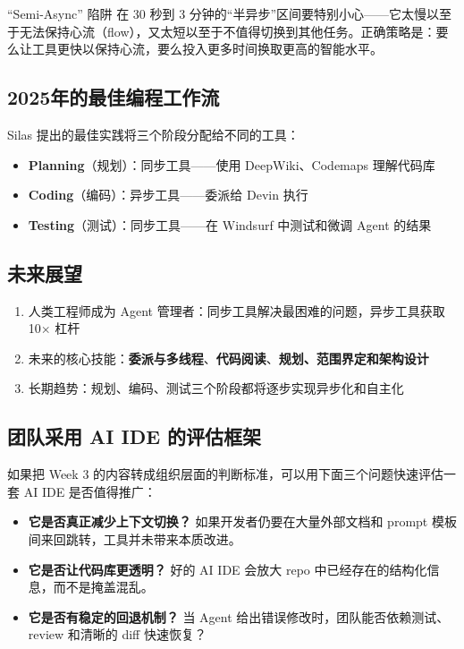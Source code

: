 \begin{warningbox}{``Semi-Async'' 陷阱}
在 30 秒到 3 分钟的``半异步''区间要特别小心——它太慢以至于无法保持心流（flow），又太短以至于不值得切换到其他任务。正确策略是：要么让工具更快以保持心流，要么投入更多时间换取更高的智能水平。
\end{warningbox}

\subsection{2025年的最佳编程工作流}

Silas 提出的最佳实践将三个阶段分配给不同的工具：

\begin{itemize}
    \item \textbf{Planning}（规划）：同步工具——使用 DeepWiki、Codemaps 理解代码库
    \item \textbf{Coding}（编码）：异步工具——委派给 Devin 执行
    \item \textbf{Testing}（测试）：同步工具——在 Windsurf 中测试和微调 Agent 的结果
\end{itemize}

\subsection{未来展望}

\begin{enumerate}
    \item 人类工程师成为 Agent 管理者：同步工具解决最困难的问题，异步工具获取 10$\times$ 杠杆
    \item 未来的核心技能：\textbf{委派与多线程}、\textbf{代码阅读}、\textbf{规划、范围界定和架构设计}
    \item 长期趋势：规划、编码、测试三个阶段都将逐步实现异步化和自主化
\end{enumerate}

\subsection{团队采用 AI IDE 的评估框架}

如果把 Week 3 的内容转成组织层面的判断标准，可以用下面三个问题快速评估一套 AI IDE 是否值得推广：

\begin{itemize}
    \item \textbf{它是否真正减少上下文切换？} 如果开发者仍要在大量外部文档和 prompt 模板间来回跳转，工具并未带来本质改进。
    \item \textbf{它是否让代码库更透明？} 好的 AI IDE 会放大 repo 中已经存在的结构化信息，而不是掩盖混乱。
    \item \textbf{它是否有稳定的回退机制？} 当 Agent 给出错误修改时，团队能否依赖测试、review 和清晰的 diff 快速恢复？
\end{itemize}

